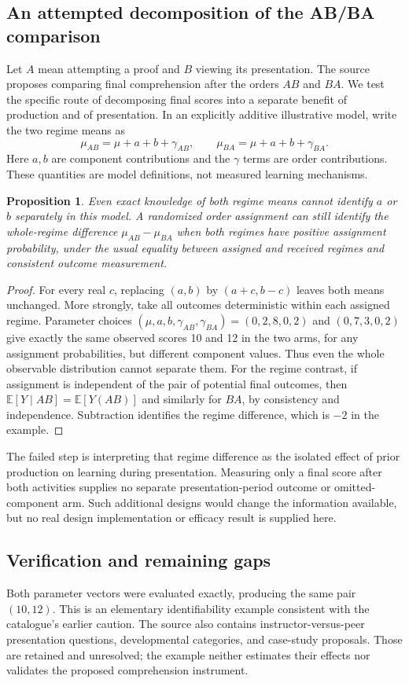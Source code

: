 \documentclass[11pt]{article}
\newtheorem{proposition}{Proposition}
\begin{document}
\subsection{An attempted decomposition of the AB/BA comparison}
Let $A$ mean attempting a proof and $B$ viewing its presentation. The source proposes comparing final comprehension after the orders $AB$ and $BA$. We test the specific route of decomposing final scores into a separate benefit of production and of presentation. In an explicitly additive illustrative model, write the two regime means as
\[
\mu_{AB}=\mu+a+b+\gamma_{AB},\qquad
\mu_{BA}=\mu+a+b+\gamma_{BA}.
\]
Here $a,b$ are component contributions and the $\gamma$ terms are order contributions. These quantities are model definitions, not measured learning mechanisms.
\begin{proposition}
Even exact knowledge of both regime means cannot identify $a$ or $b$ separately in this model. A randomized order assignment can still identify the whole-regime difference $\mu_{AB}-\mu_{BA}$ when both regimes have positive assignment probability, under the usual equality between assigned and received regimes and consistent outcome measurement.
\end{proposition}
\begin{proof}
For every real $c$, replacing $(a,b)$ by $(a+c,b-c)$ leaves both means unchanged. More strongly, take all outcomes deterministic within each assigned regime. Parameter choices $(\mu,a,b,\gamma_{AB},\gamma_{BA})=(0,2,8,0,2)$ and $(0,7,3,0,2)$ give exactly the same observed scores 10 and 12 in the two arms, for any assignment probabilities, but different component values. Thus even the whole observable distribution cannot separate them. For the regime contrast, if assignment is independent of the pair of potential final outcomes, then $\mathbb E[Y\mid AB]=\mathbb E[Y(AB)]$ and similarly for $BA$, by consistency and independence. Subtraction identifies the regime difference, which is $-2$ in the example.
\end{proof}
The failed step is interpreting that regime difference as the isolated effect of prior production on learning during presentation. Measuring only a final score after both activities supplies no separate presentation-period outcome or omitted-component arm. Such additional designs would change the information available, but no real design implementation or efficacy result is supplied here.
\subsection{Verification and remaining gaps}
Both parameter vectors were evaluated exactly, producing the same pair $(10,12)$. This is an elementary identifiability example consistent with the catalogue's earlier caution. The source also contains instructor-versus-peer presentation questions, developmental categories, and case-study proposals. Those are retained and unresolved; the example neither estimates their effects nor validates the proposed comprehension instrument.
\end{document}
